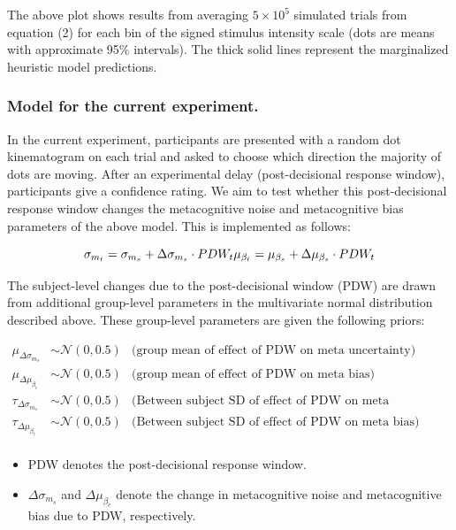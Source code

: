 \documentclass[
]{article}
\begin{document}
The above plot shows results from averaging \ensuremath{5\times 10^{5}}
simulated trials from equation (2) for each bin of the signed stimulus
intensity scale (dots are means with approximate 95\% intervals). The
thick solid lines represent the marginalized heuristic model
predictions.

\subsubsection{Model for the current
experiment.}\label{model-for-the-current-experiment.}

In the current experiment, participants are presented with a random dot
kinematogram on each trial and asked to choose which direction the
majority of dots are moving. After an experimental delay
(post-decisional response window), participants give a confidence
rating. We aim to test whether this post-decisional response window
changes the metacognitive noise and metacognitive bias parameters of the
above model. This is implemented as follows:

\[
\sigma_{m_t}  = \sigma_{m_s} + \Delta{\sigma_{m_s}} \cdot PDW_t\\
\mu_{\beta_t} = \mu_{\beta_s} + \Delta{\mu_{\beta_s}} \cdot PDW_t
\]

The subject-level changes due to the post-decisional window (PDW) are
drawn from additional group-level parameters in the multivariate normal
distribution described above. These group-level parameters are given the
following priors:

\[
\begin{aligned}
\mu_{\Delta{\sigma_{m_s}}} &\sim \mathcal{N}(0, 0.5) & \text{(group mean of effect of PDW on meta uncertainty)} \\
\mu_{\Delta{\mu_{\beta_c}}} &\sim \mathcal{N}(0, 0.5)  & \text{(group mean of effect of PDW on meta bias)} \\
\tau_{\Delta{\sigma_{m_s}}} &\sim \mathcal{N}(0, 0.5) & \text{(Between subject SD of effect of PDW on meta uncertainty)} \\
\tau_{\Delta{\mu_{\beta_c}}} &\sim \mathcal{N}(0, 0.5)  & \text{(Between subject SD of effect of PDW on meta bias)} \\
\end{aligned}
\]

\begin{itemize}
\item
  PDW denotes the post-decisional response window.
\item
  \({\Delta{\sigma_{m_s}}}\) and \(\Delta{\mu_{\beta_c}}\) denote the
  change in metacognitive noise and metacognitive bias due to PDW,
  respectively.
\end{itemize}
\end{document}

